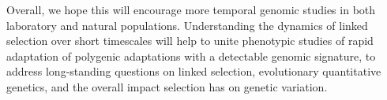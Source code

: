 \documentclass[11pt]{article}
\newcommand{\gc}[1]{{\it \color{red} #1 } }
\DeclareMathOperator{\cov}{Cov}
\begin{document}
Overall, we hope this will encourage more temporal genomic studies in both
laboratory and natural populations. Understanding the dynamics of linked
selection over short timescales will help to unite phenotypic studies of rapid
adaptation of polygenic adaptations with a detectable genomic signature, to
address long-standing questions on linked selection, evolutionary quantitative
genetics, and the overall impact selection has on genetic variation. 











\end{document}

